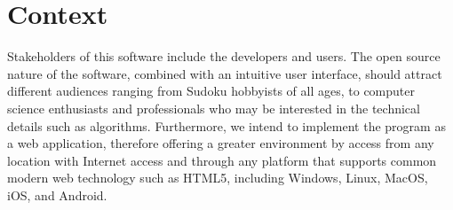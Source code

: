 \documentclass[11pt]{article}
\begin{document}
\section{Context}
Stakeholders of this software include the developers and users. The open source nature of the software, combined with an intuitive user interface, should attract different audiences ranging from Sudoku hobbyists of all ages, to computer science enthusiasts and professionals who may be interested in the technical details such as algorithms. Furthermore, we intend to implement the program as a web application, therefore offering a greater environment by access from any location with Internet access and through any platform that supports common modern web technology such as HTML5, including Windows, Linux, MacOS, iOS, and Android.
\end{document}
